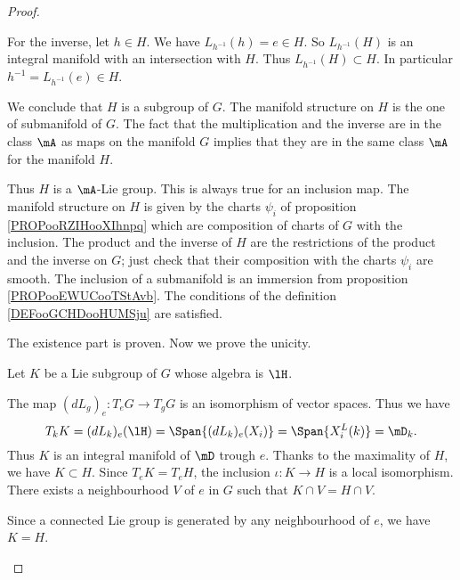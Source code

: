 \begin{proof}
\begin{subproof}
		For the inverse, let \( h\in H\). We have \( L_{h^{-1}}(h)=e\in H\). So \( L_{h^{-1}}(H)\) is an integral manifold with an intersection with \( H\). Thus \( L_{h^{-1}}(H)\subset H\). In particular \( h^{-1}=L_{h^{-1}}(e)\in H\).

		We conclude that \( H\) is a subgroup of \( G\).
		The manifold structure on \( H\) is the one of submanifold of \( G\). The fact that the multiplication and the inverse are in the class \( \mA\) as maps on the manifold \( G\) implies that they are in the same class \( \mA\) for the manifold \( H\).

		Thus \( H\) is a \( \mA\)-Lie group.
		This is always true for an inclusion map.
		The manifold structure on \( H\) is given by the charts \( \psi_i\) of proposition \ref{PROPooRZIHooXIhnpq} which are composition of charts of \( G\) with the inclusion. The product and the inverse of \( H\) are the restrictions of the product and the inverse on \( G\); just check that their composition with the charts \( \psi_i\) are smooth.
		The inclusion of a submanifold is an immersion from proposition \ref{PROPooEWUCooTStAvb}.
		The conditions of the definition \ref{DEFooGCHDooHUMSju} are satisfied.
	\end{subproof}
	The existence part is proven. Now we prove the unicity.

	Let \( K\) be a Lie subgroup of \( G\) whose algebra is \( \lH\).
	\begin{subproof}
		\spitem[\( T_kK=\mD_k\)]
		The map \( (dL_g)_e\colon T_eG\to T_gG\) is an isomorphism of vector spaces. Thus we have
		\begin{equation}
			T_kK=(dL_k)_e(\lH)=\Span\{ (dL_k)_e(X_i) \}=\Span\{ X_i^L(k) \}=\mD_k.
		\end{equation}
		\spitem[Maximality]
		Thus \( K\) is an integral manifold of \( \mD\) trough \( e\). Thanks to the maximality of \( H\), we have \( K\subset H\). Since \( T_eK=T_eH\), the inclusion \( \iota\colon K\to H\) is a local isomorphism. There exists a neighbourhood \( V\) of \( e\) in \( G\) such that \( K\cap V=H\cap V\).

		Since a connected Lie group is generated by any neighbourhood of \( e\), we have \( K=H\).
	\end{subproof}
\end{proof}


